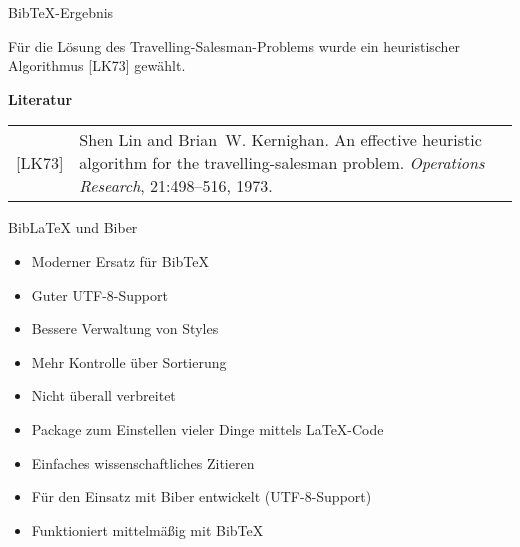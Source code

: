 \documentclass{beamer}
\begin{document}

		\begin{frame}{Bib\TeX{}-Ergebnis}

			\vspace{0.2cm}
			Für die Lösung des Travelling-Salesman-Problems
			wurde ein heuristischer Algorithmus [LK73]
			gewählt.

			\vspace{0.5cm}
			{\Large \textbf{Literatur}}\\

			\vspace{0.3cm}
			\begin{tabular}{lp{9cm}}
				[LK73] & Shen Lin and Brian~W. Kernighan. An effective heuristic algorithm for
				         the travelling-salesman problem.
				         {\em Operations Research}, 21:498--516, 1973.
			\end{tabular}
		\end{frame}


		\begin{frame}{Bib\LaTeX{} und Biber}

			\begin{itemize}
				\item Moderner Ersatz für Bib\TeX{}
				\item Guter UTF-8-Support
				\item Bessere Verwaltung von Styles
				\item Mehr Kontrolle über Sortierung
				\item Nicht überall verbreitet
			\end{itemize}
			\begin{itemize}
				\item Package zum Einstellen vieler Dinge mittels \LaTeX{}-Code
				\item Einfaches wissenschaftliches Zitieren
				\item Für den Einsatz mit Biber entwickelt (UTF-8-Support)
				\item Funktioniert mittelmäßig mit Bib\TeX{}
			\end{itemize}


		\end{frame}
\end{document}

